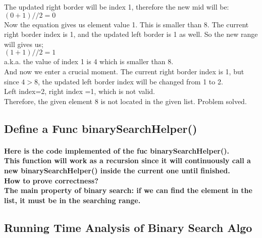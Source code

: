 \documentclass{article}
\begin{document}
{The updated right border will be index 1, therefore the new mid will be:\\
$(0 + 1) // 2 = 0$\\
Now the equation gives us element value 1. This is smaller than 8. The current right border index is 1, and the updated left border is 1 as well. So the new range will gives us;\\
$(1 + 1) // 2 = 1$\\
a.k.a. the value of index 1 is 4 which is smaller than 8.\\
And now we enter a crucial moment. The current right border index is 1, but since $4 > 8$, the updated left border index will be changed from 1 to 2.\\
Left index=2, right index =1, which is not valid.\\
Therefore, the given element 8 is not located in the given list. Problem solved.}

\subsection{Define a Func binarySearchHelper()}

\paragraph{Here is the code implemented of the fuc binarySearchHelper().\\
This function will work as a recursion since it will continuously call a new binarySearchHelper() inside the current one until finished.\\
How to prove correctness?\\
The main property of binary search: if we can find the element in the list, it must be in the searching range.}

\subsection{Running Time Analysis of Binary Search Algo}
\end{document}
